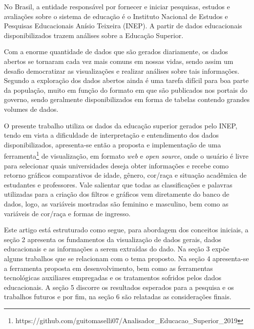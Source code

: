 \documentclass[12pt]{article}
\begin{document}
No Brasil, a entidade responsável por fornecer e iniciar pesquisas, estudos e avaliações sobre o sistema de educação é o Instituto Nacional de Estudos e Pesquisas Educacionais Anísio Teixeira (INEP). A partir de dados educacionais disponibilizados trazem análises sobre a Educação Superior.

Com a enorme quantidade de dados que são gerados diariamente, os dados abertos se tornaram cada vez mais comuns em nossas vidas, sendo assim um desafio democratizar as visualizações e realizar análises sobre tais informações. Segundo \cite{macedo:2020} a exploração dos dados abertos ainda é uma tarefa difícil para boa parte da população, muito em função do formato em que são publicados nos portais do governo, sendo geralmente disponibilizados em forma de tabelas contendo grandes volumes de dados.

O presente trabalho utiliza os dados da educação superior gerados pelo INEP, tendo em vista a dificuldade de interpretação e entendimento dos dados disponibilizados, apresenta-se então a proposta e implementação de uma ferramenta\footnote{https://github.com/guitomaselli07/Analisador\_Educacao\_Superior\_2019} de visualização, em formato \textit{web} e \textit{open source}, onde o usuário é livre para selecionar quais universidades deseja obter informações e recebe como retorno gráficos comparativos de idade, gênero, cor/raça e situação acadêmica de estudantes e professores. Vale  salientar que todas as classificações e palavras utilizadas para a criação dos filtros e gráficos vem diretamente do banco de dados, logo, as variáveis mostradas são feminino e masculino, bem como as variáveis de cor/raça e formas de ingresso.

Este artigo está estruturado como segue, para abordagem dos conceitos iniciais, a seção 2 apresenta os fundamentos da visualização de dados gerais, dados educacionais e as informações a serem extraídas do dado. Na seção 3 expõe alguns trabalhos que se relacionam com o tema proposto. Na seção 4 apresenta-se a ferramenta proposta em desenvolvimento, bem como as ferramentas tecnológicas auxiliares empregadas e os tratamentos sofridos pelos dados educacionais. A seção 5 discorre os resultados esperados para a pesquisa e os trabalhos futuros e por fim, na seção 6 são relatadas as considerações finais.
\end{document}
